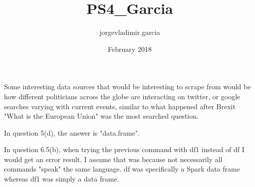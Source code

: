 \documentclass{article}
\title{PS4_Garcia}
\author{jorgevladimir.garcia }
\date{February 2018}
\begin{document}
\maketitle

Some interesting data sources that would be interesting to scrape from would be how different politicians across the globe are interacting on twitter, or google searches varying with current events, similar to what happened after Brexit "What is the European Union" was the most searched question. 

In question 5(d), the answer is "data.frame". 

In question 6.5(b), when trying the previous command with df1 instead of df I would get an error result. I assume that was because not necessarily all commands "speak" the same language. df was specifically a Spark data frame whereas df1 was simply a data frame. 
\end{document}
